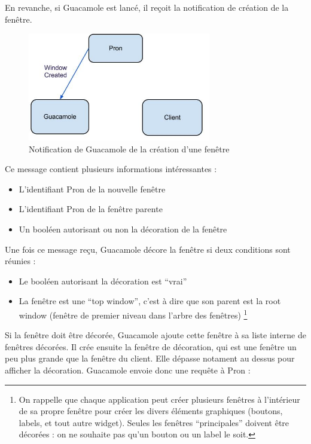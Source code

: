 En revanche, si Guacamole est lancé, il reçoit la notification de création de la fenêtre.

\begin{figure}[H]
  \centering
  \includegraphics[width=8cm]{images/Guacamole_anim_3.jpg}
  \caption{Notification de Guacamole de la création d'une fenêtre}
  \label{fig:guacamole_anim_3}
\end{figure}

Ce message contient plusieurs informations intéressantes :

\begin{itemize}
  \item L'identifiant Pron de la nouvelle fenêtre
  \item L'identifiant Pron de la fenêtre parente
  \item Un booléen autorisant ou non la décoration de la fenêtre
\end{itemize}

Une fois ce message reçu, Guacamole décore la fenêtre si deux conditions sont réunies :

\begin{itemize}
  \item Le booléen autorisant la décoration est ``vrai''
  \item La fenêtre est une ``top window'', c'est à dire que son parent est la root window (fenêtre de premier niveau dans l'arbre des fenêtres)
    \footnote{On rappelle que chaque application peut créer plusieurs fenêtres à l'intérieur de sa propre fenêtre pour créer les divers éléments graphiques (boutons, labels, et tout autre widget). Seules les fenêtres ``principales'' doivent être décorées : on ne souhaite pas qu'un bouton ou un label le soit.} 
\end{itemize}

Si la fenêtre doit être décorée, Guacamole ajoute cette fenêtre à sa liste interne de fenêtres décorées.
Il crée ensuite la fenêtre de décoration, qui est une fenêtre un peu plus grande que la fenêtre du client.
Elle dépasse notament au dessus pour afficher la décoration.
Guacamole envoie donc une requête à Pron :

